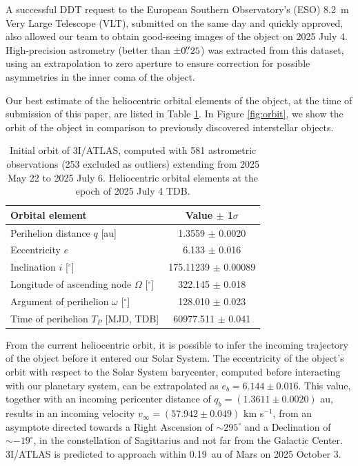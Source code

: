 \documentclass[twocolumn,longbib]{aastex7}
\begin{document}
\begin{CJK*}{UTF8}{gbsn}
A successful DDT request to the European Southern Observatory's (ESO) 8.2~m Very Large Telescope (VLT), submitted on the same day and quickly approved, also allowed our team to obtain good-seeing images of the object on 2025 July 4. High-precision astrometry (better than $\pm0\mbox{$.\!\!^{\prime\prime}$}25$) was extracted from this dataset, using an extrapolation to zero aperture to ensure correction for possible asymmetries in the inner coma of the object.


Our best estimate of the heliocentric orbital elements of the object, at the time of submission of this paper, are listed in Table \ref{table:orbit}. In Figure \ref{fig:orbit}, we show the orbit of the object in comparison to previously discovered interstellar objects.

\begin{table}
\centering
\caption{Initial orbit of 3I/ATLAS, computed with 581 astrometric observations (253 excluded as outliers) extending from 2025 May 22 to 2025 July 6. Heliocentric orbital elements at the epoch of 2025 July 4 TDB.}
\begin{tabular}{lc}
\hline
Orbital element & Value $\pm$ 1$\sigma$ \\
\hline
Perihelion distance $q$ [au]                    &  1.3559 $\pm$ 0.0020 \\
Eccentricity $e$                                &  6.133    $\pm$ 0.016 \\
Inclination $i$ [$^\circ$]                      & 175.11239   $\pm$ 0.00089  \\
Longitude of ascending node $\Omega$ [$^\circ$] & 322.145   $\pm$ 0.018  \\
Argument of perihelion $\omega$ [$^\circ$]      & 128.010   $\pm$ 0.023  \\
Time of perihelion $T_P$ [MJD, TDB]             & 60977.511 $\pm$ 0.041  \\
\hline
\end{tabular}
\label{table:orbit}
\end{table}


From the current heliocentric orbit, it is possible to infer the incoming trajectory of the object before it entered our Solar System. The eccentricity of the object's orbit with respect to the Solar System barycenter, computed before interacting with our planetary system, can be extrapolated as $e_b = 6.144 \pm 0.016$. This value, together with an incoming pericenter distance of $q_b = (1.3611 \pm 0.0020)$ au, results in an incoming velocity $v_{\infty} = (57.942 \pm 0.049)$ km s$^{-1}$, from an asymptote directed towards a Right Ascension of $\sim 295^\circ$ and a Declination of $\sim -19^\circ$, in the constellation of Sagittarius and not far from the Galactic Center. 3I/ATLAS is predicted to approach within 0.19~au of Mars on 2025 October 3.


\end{CJK*}
\end{document}
